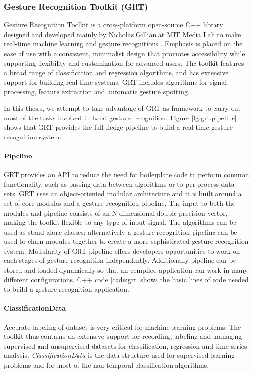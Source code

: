 \subsubsection{Gesture Recognition Toolkit (GRT)} \label{sec:grt} Gesture Recognition Toolkit is a cross-platform open-source C++ library designed and developed mainly by Nicholas Gillian at MIT Media Lab to make real-time machine learning and gesture recognitions \cite{16}. Emphasis is placed on the ease of use with a consistent, minimalist design that promotes accessibility while supporting flexibility and customization for advanced users. The toolkit features a broad range of classification and regression algorithms, and has extensive support for building real-time systems. GRT includes algorithms for signal processing, feature extraction and automatic gesture spotting. 

In this thesis, we attempt to take advantage of GRT as framework to carry out most of the tasks involved in hand gesture recognition. Figure \ref{fg:grt:pipeline} shows that GRT provides the full fledge pipeline to build a real-time gesture recognition system. 



\paragraph*{Pipeline} GRT provides an API to reduce the need for boilerplate code to perform common functionality, such as passing data between algorithms or to per-process data sets. GRT uses an object-oriented modular architecture and it is built around a set of core modules and a gesture-recognition pipeline. The input to both the modules and pipeline consists of an N-dimensional double-precision vector, making the toolkit flexible to any type of input signal. The algorithms can be used as stand-alone classes; alternatively a gesture recognition pipeline can be used to chain modules together to create a more sophisticated gesture-recognition system. Modularity of GRT pipeline offers developers opportunities to work on each stages of gesture recognition independently. Additionally pipeline can be stored and loaded dynamically so that an compiled application can work in many different configurations. C++ code \ref{code:grt} shows the basic lines of code needed to build a gesture recognition application.

 \label{code:grt}

\paragraph*{ClassificationData} Accurate labeling of dataset is very critical for machine learning problems. The toolkit thus contains an extensive support for recording, labeling and managing supervised and unsupervised datasets for classification, regression and time series analysis. \textit{ClassificationData} is the data structure used for supervised learning problems and for most of the non-temporal classification algorithms.

